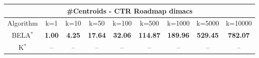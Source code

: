 \begin{tabular}{c|cccccccc}\toprule
\multicolumn{9}{c}{#Centroids - CTR Roadmap dimacs}\\ \midrule
Algorithm & k=1 & k=10 & k=50 & k=100 & k=500 & k=1000 & k=5000 & k=10000 \\ \midrule
BELA$^*$ & \textbf{1.00} & \textbf{4.25} & \textbf{17.64} & \textbf{32.06} & \textbf{114.87} & \textbf{189.96} & \textbf{529.45} & \textbf{782.07} \\
K$^*$ & -- & -- & -- & -- & -- & -- & -- & -- \\ \bottomrule 
\end{tabular}
